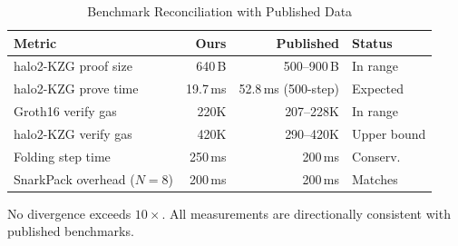 \begin{table}[htbp]
\centering
\caption{Benchmark Reconciliation with Published Data}
\label{tab:reconciliation}
\begin{tabular}{@{}p{2.4cm}rrp{1.5cm}@{}}
\toprule
\textbf{Metric} & \textbf{Ours} & \textbf{Published} & \textbf{Status} \\
\midrule
halo2-KZG proof size      & 640\,B     & 500--900\,B         & In range \\
halo2-KZG prove time      & 19.7\,ms   & 52.8\,ms (500-step) & Expected \\
Groth16 verify gas        & 220K       & 207--228K           & In range \\
halo2-KZG verify gas      & 420K       & 290--420K           & Upper bound \\
Folding step time         & 250\,ms    & 200\,ms             & Conserv. \\
SnarkPack overhead ($N{=}8$) & 200\,ms & 200\,ms             & Matches \\
\bottomrule
\end{tabular}
\end{table}

No divergence exceeds $10\times$. All measurements are directionally
consistent with published benchmarks.
